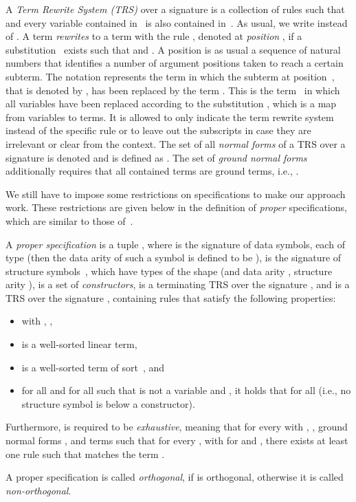 \documentclass{eptcs}
\begin{document}
A \emph{Term Rewrite System (TRS)} over a signature  is a collection of
rules  such that  and every
variable contained in~ is also contained in~. As usual, we write
 instead of .
A term  \emph{rewrites} to a term 
with the rule , denoted 
at \emph{position} , if a substitution~
exists such that  and .
A position is as usual a sequence of natural numbers that identifies a number of
argument positions taken to reach a certain subterm. The notation 
represents the term  in which the subterm at position~, that is denoted
by , has been replaced by the term . This is the term~ in
which all variables have been replaced according to the substitution ,
which is a map from variables to terms.
It is allowed to only indicate the term rewrite system  instead of
the specific rule  or to leave out the subscripts in case they
are irrelevant or clear from the context.
The set of all \emph{normal forms} of a TRS  over a
signature  is denoted  and is defined as .
The set of \emph{ground normal forms}  additionally requires
that all contained terms are ground terms, i.e.,
.


We still have to impose some restrictions on specifications to make our
approach work. These restrictions are given below in the definition of
\emph{proper} specifications, which are similar to those of~\cite{ZR10}.

\begin{definition}
\label{def:Spec}
A \emph{proper specification} is a tuple
,
where  is the signature of data symbols, each of type 
(then the data arity of such a symbol  is defined to be ),
 is the signature of structure symbols~,
which have types of the shape 
(and data arity , structure arity ),
 is a set of \emph{constructors},
 is a terminating TRS over the signature , and
 is a TRS over the signature ,
containing rules 
that satisfy the following properties:
\begin{itemize}
\item
 with , ,

\item
 is a well-sorted linear term,

\item
 is a well-sorted term of sort~, and

\item
for all  and for all  such that  is not
a variable and , it holds that
 for all 
(i.e., no structure symbol is below a constructor).
\end{itemize}

Furthermore,  is required to be \emph{exhaustive}, meaning that for every
 with , , ground normal
forms , and terms
 such that for every
,
 with
 for  and
, there exists at least one rule  such that
 matches the term .

A proper specification  is called \emph{orthogonal}, if 
is orthogonal, otherwise it is called \emph{non-orthogonal}.
\end{definition}
\end{document}
